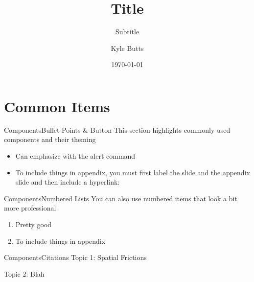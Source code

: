 \documentclass[aspectratio=43]{beamer}
\title{Title}
\subtitle{Subtitle}
\date{\today}
\author{Kyle Butts}
\begin{document}
\maketitle

\section{Common Items}

\begin{frame}{Components}{Bullet Points \& Button}\label{main1}
    This section highlights commonly used components and their theming

    \begin{itemize}
        \item Can emphasize with \alert{the alert command}
        
        \item To include things in appendix, you must first label the slide and the appendix slide and then include a hyperlink:
        
        \vspace{5mm}
        \hyperlink{appendix1}{}
    \end{itemize}
\end{frame}

\begin{frame}{Components}{Numbered Lists}
    You can also use numbered items that look a bit more professional

    \begin{enumerate}
        \item Pretty good
        
        \item To include things in appendix
    \end{enumerate}
\end{frame}

\begin{frame}{Components}{Citations}
    Topic 1: Spatial Frictions
    \begin{citecolor}
    \end{citecolor}

    \vspace{5mm}
    Topic 2: Blah 
    \begin{citecolor}
    \end{citecolor}
\end{frame}
\end{document}
